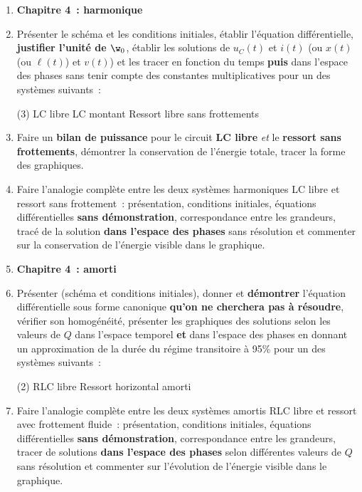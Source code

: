 \documentclass[a4paper, 12pt, final, garamond]{book}
\begin{document}
\begin{enumerate}
	\item[] \textbf{Chapitre 4~: harmonique}
	\item Présenter le schéma et les conditions initiales, établir l'équation
	      différentielle, \textbf{justifier l'unité de $\w_0$}, établir les
	      solutions de $u_C(t)$ et $i(t)$ (ou $x(t)$ (ou $\ell(t)$) et $v(t)$)
	      et les tracer en fonction du temps \textbf{puis} dans l'espace des
	      phases sans tenir compte des constantes multiplicatives pour un des
	      systèmes suivants~:
	      \begin{tasks}[label=\protect\fbox{\Alph*}, label-width=4ex](3)
		      \task LC libre
		      \task LC montant
		      \task Ressort libre sans frottements
	      \end{tasks}

	\item Faire un \textbf{bilan de puissance} pour le circuit \textbf{LC libre}
	      \textit{et} le \textbf{ressort sans frottements}, démontrer la
	      conservation de l'énergie totale, tracer la forme des graphiques.

	\item Faire l'analogie complète entre les deux systèmes harmoniques LC libre
	      et ressort sans frottement~: présentation, conditions initiales,
	      équations différentielles \textbf{sans démonstration}, correspondance
	      entre les grandeurs, tracé de la solution \textbf{dans l'espace des
		      phases} sans résolution et commenter sur la conservation de l'énergie
	      visible dans le graphique.

	\item[] \textbf{Chapitre 4~: amorti}
	\item Présenter (schéma et conditions initiales),
	      donner et \textbf{démontrer} l'équation différentielle sous
	      forme canonique \textbf{qu'on ne cherchera pas à résoudre}, vérifier son
	      homogénéité, présenter les graphiques des solutions selon les valeurs de
	      $Q$ dans l'espace temporel \textbf{et} dans l'espace des phases en donnant
	      un approximation de la durée du régime transitoire à 95\% pour un des
	      systèmes suivants~:
	      \begin{tasks}[label=\protect\fbox{\Alph*}, label-width=4ex](2)
		      \task RLC libre
		      \task Ressort horizontal amorti
	      \end{tasks}

	\item Faire l'analogie complète entre les deux systèmes amortis RLC libre et
	      ressort avec frottement fluide~: présentation, conditions initiales,
	      équations différentielles \textbf{sans démonstration}, correspondance
	      entre les grandeurs, tracer de solutions \textbf{dans l'espace des
		      phases} selon différentes valeurs de $Q$ sans résolution et commenter
	      sur l'évolution de l'énergie visible dans le graphique.


\end{enumerate}
\end{document}

